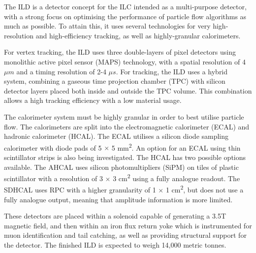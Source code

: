 The \acrfull{ILD} is a detector concept for the \acrshort{ILC} intended as a multi-purpose detector, with a strong focus on optimising the performance of particle flow algorithms as much as possible. To attain this, it uses several technologies for very high-resolution and high-efficiency tracking, as well as highly-granular calorimeters.

For vertex tracking, the \acrshort{ILD} uses three double-layers of pixel detectors using monolithic active pixel sensor (\acrshort{MAPS}) technology, with a spatial resolution of 4 $\mu m$ and a timing resolution of 2-4 $\mu s$. For tracking, the \acrshort{ILD} uses a hybrid system, combining a gaseous time projection chamber (\acrshort{TPC}) with silicon detector layers placed both inside and outside the \acrshort{TPC} volume. This combination allows a high tracking efficiency with a low material usage.

The calorimeter system must be highly granular in order to best utilise particle flow. The calorimeters are split into the electromagnetic calorimeter (\acrshort{ECAL}) and hadronic calorimeter (\acrshort{HCAL}). The \acrshort{ECAL} utilises a silicon diode sampling calorimeter with diode pads of 5 $\times$ 5 mm\textsuperscript{2}. An option for an ECAL using thin scintillator strips is also being investigated. The \acrshort{HCAL} has two possible options available. The \acrfull{AHCAL} uses silicon photomultipliers (\acrshort{SiPM}) on tiles of plastic scintillator with a resolution of 3 $\times$ 3 cm\textsuperscript{2} using a fully analogue readout. The \acrfull{SDHCAL} uses \acrfull{RPC} with a higher granularity of 1 $\times$ 1 cm\textsuperscript{2}, but does not use a fully analogue output, meaning that amplitude information is more limited. 

These detectors are placed within a solenoid capable of generating a 3.5T magnetic field, and then within an iron flux return yoke which is instrumented for muon identification and tail catching, as well as providing structural support for the detector. The finished ILD is expected to weigh 14,000 metric tonnes.

%

